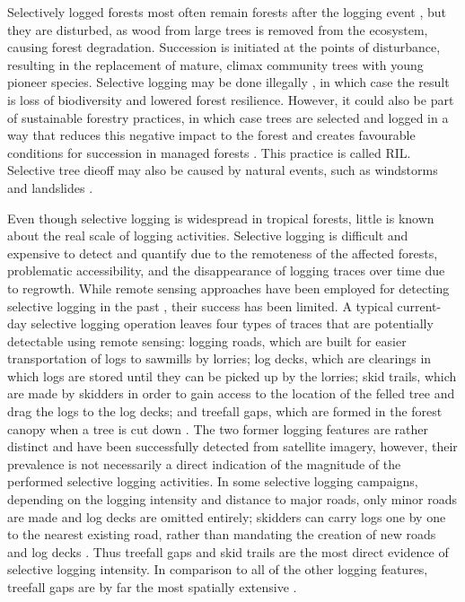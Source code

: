 \documentclass[a4paper,12pt]{scrbook}
\begin{document}
Selectively logged forests most often remain forests after the logging event \citep{asner_condition_2006}, but they are disturbed, as wood from large trees is removed from the ecosystem, causing forest degradation. Succession is initiated at the points of disturbance, resulting in the replacement of mature, climax community trees with young pioneer species. Selective logging may be done illegally \citep{rutishauser_rapid_2015}, in which case the result is loss of biodiversity and lowered forest resilience. However, it could also be part of sustainable forestry practices, in which case trees are selected and logged in a way that reduces this negative impact to the forest and creates favourable conditions for succession in managed forests \citep{west_forest_2014, keller_4._2004}. This practice is called \ac{RIL}. Selective tree dieoff may also be caused by natural events, such as windstorms and landslides \citep{frolking_forest_2009}. 

Even though selective logging is widespread in tropical forests, little is known about the real scale of logging activities. Selective logging is difficult and expensive to detect and quantify due to the remoteness of the affected forests, problematic accessibility, and the disappearance of logging traces over time due to regrowth. While remote sensing approaches have been employed for detecting selective logging in the past \citep{shimizu_using_2017, frolking_forest_2009, broadbent_recovery_2006, keller_4._2004}, their success has been limited. A typical current-day selective logging operation leaves four types of traces that are potentially detectable using remote sensing: logging roads, which are built for easier transportation of logs to sawmills by lorries; log decks, which are clearings in which logs are stored until they can be picked up by the lorries; skid trails, which are made by skidders in order to gain access to the location of the felled tree and drag the logs to the log decks; and treefall gaps, which are formed in the forest canopy when a tree is cut down \citep{asner_remote_2002}. The two former logging features are rather distinct and have been successfully detected from satellite imagery, however, their prevalence is not necessarily a direct indication of the magnitude of the performed selective logging activities. In some selective logging campaigns, depending on the logging intensity and distance to major roads, only minor roads are made and log decks are omitted entirely; skidders can carry logs one by one to the nearest existing road, rather than mandating the creation of new roads and log decks \citep{read_spatial_2003}. Thus treefall gaps and skid trails are the most direct evidence of selective logging intensity. In comparison to all of the other logging features, treefall gaps are by far the most spatially extensive \citep{asner_remote_2002}.
\end{document}
